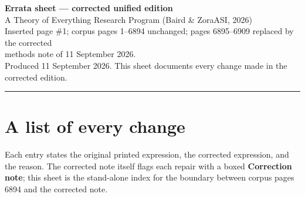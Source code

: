 \documentclass[11pt]{article}
\begin{document}
\begin{center}
{\LARGE\bfseries Errata sheet --- corrected unified edition}\\[6pt]
{\large A Theory of Everything Research Program (Baird \& ZoraASI, 2026)}\\[2pt]
{\large Inserted page \#1; corpus pages 1--6894 unchanged; pages 6895--6909 replaced by the corrected\\[-2pt] methods note of 11 September 2026.}\\[4pt]
{\small Produced 11 September 2026. This sheet documents every change made in the corrected edition.}
\end{center}

\vspace{4pt}
\rule{\linewidth}{0.5pt}

\section*{A list of every change}

Each entry states the original printed expression, the corrected expression, and the reason. The
corrected note itself flags each repair with a boxed \textbf{Correction note}; this sheet is the
stand-alone index for the boundary between corpus pages 6894 and the corrected note.
\end{document}
